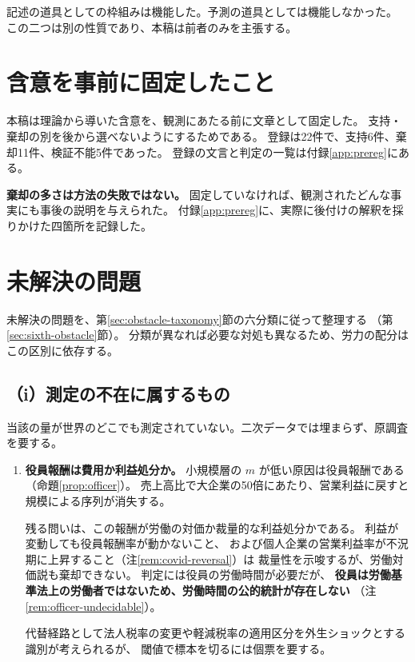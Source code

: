 記述の道具としての枠組みは機能した。予測の道具としては機能しなかった。
この二つは別の性質であり、本稿は前者のみを主張する。

\section{含意を事前に固定したこと}
\label{sec:prereg-worked}

本稿は理論から導いた含意を、観測にあたる前に文章として固定した。
支持・棄却の別を後から選べないようにするためである。
登録は22件で、支持6件、棄却11件、検証不能5件であった。
登録の文言と判定の一覧は付録\ref{app:prereg}にある。

\textbf{棄却の多さは方法の失敗ではない。}
固定していなければ、観測されたどんな事実にも事後の説明を与えられた。
付録\ref{app:prereg}に、実際に後付けの解釈を採りかけた四箇所を記録した。

\section{未解決の問題}

未解決の問題を、第\ref{sec:obstacle-taxonomy}節の六分類に従って整理する
（第\ref{sec:sixth-obstacle}節）。
分類が異なれば必要な対処も異なるため、労力の配分はこの区別に依存する。

\subsection{（i）測定の不在に属するもの}

当該の量が世界のどこでも測定されていない。二次データでは埋まらず、原調査を要する。

\begin{enumerate}[label=(\arabic*)]
\item \textbf{役員報酬は費用か利益処分か。}
小規模層の $m$ が低い原因は役員報酬である（命題\ref{prop:officer}）。
売上高比で大企業の50倍にあたり、営業利益に戻すと規模による序列が消失する。

残る問いは、この報酬が労働の対価か裁量的な利益処分かである。
利益が変動しても役員報酬率が動かないこと、
および個人企業の営業利益率が不況期に上昇すること（注\ref{rem:covid-reversal}）は
裁量性を示唆するが、労働対価説も棄却できない。
判定には役員の労働時間が必要だが、
\textbf{役員は労働基準法上の労働者ではないため、労働時間の公的統計が存在しない}
（注\ref{rem:officer-undecidable}）。

代替経路として法人税率の変更や軽減税率の適用区分を外生ショックとする識別が考えられるが、
閾値で標本を切るには個票を要する。
\end{enumerate}

